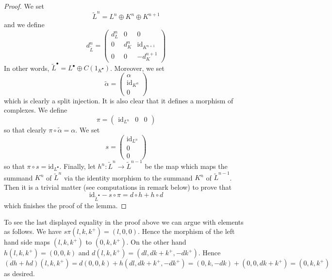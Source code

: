\begin{proof}
We set
$$
\tilde L^n = L^n \oplus K^n \oplus K^{n + 1}
$$
and we define
$$
d^n_{\tilde L} =
\left(
\begin{matrix}
d^n_L & 0 & 0 \\
0 & d^n_K & \text{id}_{K^{n + 1}} \\
0 & 0 & -d^{n + 1}_K
\end{matrix}
\right)
$$
In other words, $\tilde L^\bullet = L^\bullet \oplus C(1_{K^\bullet})$.
Moreover, we set
$$
\tilde \alpha =
\left(
\begin{matrix}
\alpha \\
\text{id}_{K^n} \\
0
\end{matrix}
\right)
$$
which is clearly a split injection. It is also clear that it defines a morphism
of complexes. We define
$$
\pi =
\left(
\begin{matrix}
\text{id}_{L^n} &
0 &
0
\end{matrix}
\right)
$$
so that clearly $\pi \circ \tilde \alpha = \alpha$. We set
$$
s =
\left(
\begin{matrix}
\text{id}_{L^n} \\
0 \\
0
\end{matrix}
\right)
$$
so that $\pi \circ s = \text{id}_{L^\bullet}$. Finally,
let $h^n : \tilde L^n \to \tilde L^{n - 1}$ be the map
which maps the summand $K^n$ of $\tilde L^n$ via the identity morphism
to the summand $K^n$ of $\tilde L^{n - 1}$. Then it is a trivial matter
(see computations in remark below) to prove that
$$
\text{id}_{\tilde L^\bullet} - s \circ \pi
=
d \circ h + h \circ d
$$
which finishes the proof of the lemma.
\end{proof}

\begin{remark}
\label{remark-compute-modules}
To see the last displayed equality in the proof above we can argue
with elements as follows. We have
$s\pi(l, k, k^{+}) = (l, 0, 0)$.
Hence the morphism of the left hand side maps
$(l, k, k^{+})$ to $(0, k, k^{+})$.
On the other hand $h(l, k, k^{+}) = (0, 0, k)$ and
$d(l, k, k^{+}) = (dl, dk + k^{+}, -dk^{+})$.
Hence $(dh + hd)(l, k, k^{+}) =
d(0, 0, k) + h(dl, dk + k^{+}, -dk^{+}) =
(0, k, -dk) + (0, 0, dk + k^{+}) = (0, k, k^{+})$
as desired.
\end{remark}

